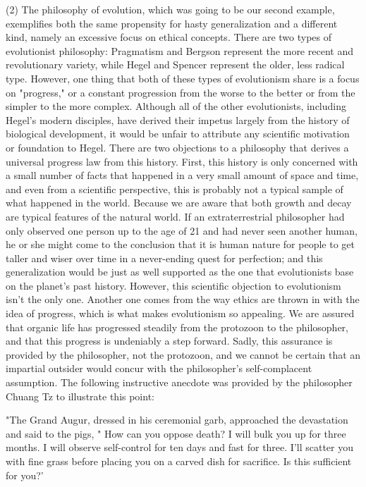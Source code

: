\documentclass[a4paper,12pt]{book}[2004/02/16]
\theoremstyle{ilemma}
\theoremstyle{itheorem}
\theoremstyle{iother}
\theoremstyle{icorollary}
\theoremstyle{numcorollary}
\theoremstyle{idefinition}
\begin{document}
(2) The philosophy of evolution, which was going to be our second example, exemplifies both the same propensity for hasty generalization and a different kind, namely an excessive focus on ethical concepts.
There are two types of evolutionist philosophy: Pragmatism and Bergson represent the more recent and revolutionary variety, while Hegel and Spencer represent the older, less radical type. However, one thing that both of these types of evolutionism share is a focus on "progress," or a constant progression from the worse to the better or from the simpler to the more complex. Although all of the other evolutionists, including Hegel's modern disciples, have derived their impetus largely from the history of biological development, it would be unfair to attribute any scientific motivation or foundation to Hegel. There are two objections to a philosophy that derives a universal progress law from this history. First, this history is only concerned with a small number of facts that happened in a very small amount of space and time, and even from a scientific perspective, this is probably not a typical sample of what happened in the world. Because we are aware that both growth and decay are typical features of the natural world. If an extraterrestrial philosopher had only observed one person up to the age of 21 and had never seen another human, he or she might come to the conclusion that it is human nature for people to get taller and wiser over time in a never-ending quest for perfection; and this generalization would be just as well supported as the one that evolutionists base on the planet's past history. However, this scientific objection to evolutionism isn't the only one. Another one comes from the way ethics are thrown in with the idea of progress, which is what makes evolutionism so appealing. We are assured that organic life has progressed steadily from the protozoon to the philosopher, and that this progress is undeniably a step forward.
Sadly, this assurance is provided by the philosopher, not the protozoon, and we cannot be certain that an impartial outsider would concur with the philosopher's self-complacent assumption. The following instructive anecdote was provided by the philosopher Chuang Tz to illustrate this point:

  "The Grand Augur, dressed in his ceremonial garb, approached the devastation and said to the pigs, " How can you oppose death? I will bulk you up for three months. I will observe self-control for ten days and fast for three. I'll scatter you with fine grass before placing you on a carved dish for sacrifice. Is this sufficient for you?'
\end{document}
